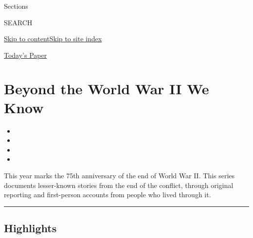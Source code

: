 Sections

SEARCH

\protect\hyperlink{site-content}{Skip to
content}\protect\hyperlink{site-index}{Skip to site index}

\href{https://myaccount.nytimes3xbfgragh.onion/auth/login?response_type=cookie\&client_id=vi}{}

\href{https://www.nytimes3xbfgragh.onion/section/todayspaper}{Today's
Paper}

\hypertarget{beyond-the-world-war-ii-we-know}{%
\section{Beyond the World War II We
Know}\label{beyond-the-world-war-ii-we-know}}

\begin{itemize}
\item
\item
\item
\item
\end{itemize}

This year marks the 75th anniversary of the end of World War II. This
series documents lesser-known stories from the end of the conflict,
through original reporting and first-person accounts from people who
lived through it.

\begin{center}\rule{0.5\linewidth}{\linethickness}\end{center}

\hypertarget{highlights}{%
\subsection{Highlights}\label{highlights}}

